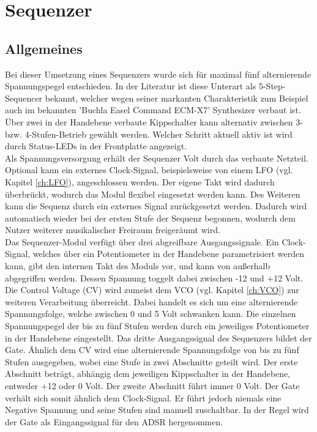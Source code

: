 \chapter{Sequenzer}
\label{ch:Sequenzer}
\section{Allgemeines}
Bei dieser Umsetzung eines Sequenzers wurde sich für maximal fünf alternierende Spannungspegel entschieden. In der Literatur ist diese Unterart als 5-Step-Sequencer bekannt, welcher wegen seiner markanten Charakteristik zum Beispiel auch im bekannten 'Buchla Easel Command ECM-X7' Synthesizer verbaut ist. Über zwei in der Handebene verbaute Kippschalter kann alternativ zwischen 3- bzw. 4-Stufen-Betrieb gewählt werden. Welcher Schritt aktuell aktiv ist wird durch Status-LEDs in der Frontplatte angezeigt.\\
Als Spannungsversorgung erhält der Sequenzer  Volt durch das verbaute Netzteil. Optional kann ein externes Clock-Signal, beispielsweise von einem LFO (vgl. Kapitel \ref{ch:LFO}), angeschlossen werden. Der eigene Takt wird dadurch überbrückt, wodurch das Modul flexibel eingesetzt werden kann. Des Weiteren kann die Sequenz durch ein externes Signal zurückgesetzt werden. Dadurch wird automatisch wieder bei der ersten Stufe der Sequenz begonnen, wodurch dem Nutzer weiterer musikalischer Freiraum freigeräumt wird.\\
Das Sequenzer-Modul verfügt über drei abgreifbare Ausgangssignale. Ein Clock-Signal, welches über ein Potentiometer in der Handebene parametrisiert werden kann, gibt den internen Takt des Moduls vor, und kann von außerhalb abgegriffen werden. Dessen Spannung toggelt dabei zwischen -12 und +12 Volt. Die Control Voltage (CV) wird zumeist dem VCO (vgl. Kapitel \ref{ch:VCO}) zur weiteren Verarbeitung überreicht. Dabei handelt es sich um eine alternierende Spannungsfolge, welche zwischen 0 und 5 Volt schwanken kann. Die einzelnen Spannungspegel der bis zu fünf Stufen werden durch ein jeweiliges Potentiometer in der Handebene eingestellt. Das dritte Ausgangssignal des Sequenzers bildet der Gate. Ähnlich dem CV wird eine alternierende Spannungsfolge von bis zu fünf Stufen ausgegeben, wobei eine Stufe in zwei Abschnitte geteilt wird. Der erste Abschnitt beträgt, abhängig dem jeweiligen Kippschalter in der Handebene, entweder +12 oder 0 Volt. Der zweite Abschnitt führt immer 0 Volt. Der Gate verhält sich somit ähnlich dem Clock-Signal. Er führt jedoch niemals eine Negative Spannung und seine Stufen sind manuell zuschaltbar. In der Regel wird der Gate als Eingangssignal für den ADSR hergenommen.

